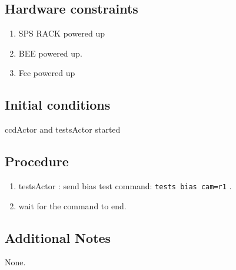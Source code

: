 \subsection{Hardware constraints}

\begin{enumerate}
    \item SPS RACK powered up
    \item \acrshort{BEE} powered up.
    \item Fee powered up
\end{enumerate}

\subsection{Initial conditions}

ccdActor and testsActor started

\subsection{Procedure}

\begin{enumerate}
    \item testsActor : send bias test command: \texttt{tests bias cam=r1} .
    \item wait for the command to end.
\end{enumerate}

\subsection{Additional Notes}
None.
